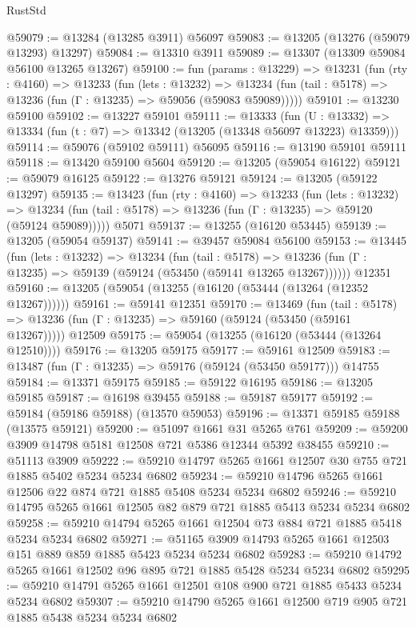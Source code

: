 \begin{lexlean}{RustStd}
\begin{coremodule}
@59079 := @13284 (@13285 @3911) @56097
@59083 := @13205 (@13276 (@59079 @13293) @13297)
@59084 := @13310 @3911
@59089 := @13307 (@13309 @59084 @56100 @13265 @13267)
@59100 := fun (params : @13229) =>
  @13231
    (fun (rty : @4160) =>
    @13233
      (fun (lets : @13232) =>
      @13234 (fun (tail : @5178) => @13236 (fun (Γ : @13235) => @59056 (@59083 @59089)))))
@59101 := @13230 @59100
@59102 := @13227 @59101
@59111 := @13333
    (fun (U : @13332) => @13334 (fun (t : @7) => @13342 (@13205 (@13348 @56097 @13223) @13359)))
@59114 := @59076 (@59102 @59111) @56095
@59116 := @13190 @59101 @59111
@59118 := @13420 @59100 @5604
@59120 := @13205 (@59054 @16122)
@59121 := @59079 @16125
@59122 := @13276 @59121
@59124 := @13205 (@59122 @13297)
@59135 := @13423
    (fun (rty : @4160) =>
    @13233
      (fun (lets : @13232) =>
      @13234 (fun (tail : @5178) => @13236 (fun (Γ : @13235) => @59120 (@59124 @59089)))))
    @5071
@59137 := @13255 (@16120 @53445)
@59139 := @13205 (@59054 @59137)
@59141 := @39457 @59084 @56100
@59153 := @13445
    (fun (lets : @13232) =>
    @13234
      (fun (tail : @5178) =>
      @13236 (fun (Γ : @13235) => @59139 (@59124 (@53450 (@59141 @13265 @13267))))))
    @12351
@59160 := @13205 (@59054 (@13255 (@16120 (@53444 (@13264 (@12352 @13267))))))
@59161 := @59141 @12351
@59170 := @13469
    (fun (tail : @5178) => @13236 (fun (Γ : @13235) => @59160 (@59124 (@53450 (@59161 @13267)))))
    @12509
@59175 := @59054 (@13255 (@16120 (@53444 (@13264 @12510))))
@59176 := @13205 @59175
@59177 := @59161 @12509
@59183 := @13487 (fun (Γ : @13235) => @59176 (@59124 (@53450 @59177))) @14755
@59184 := @13371 @59175
@59185 := @59122 @16195
@59186 := @13205 @59185
@59187 := @16198 @39455
@59188 := @59187 @59177
@59192 := @59184 (@59186 @59188) (@13570 @59053)
@59196 := @13371 @59185 @59188 (@13575 @59121)
@59200 := @51097 @1661 @31 @5265 @761
@59209 := @59200 @3909 @14798 @5181 @12508 @721 @5386 @12344 @5392 @38455
@59210 := @51113 @3909
@59222 := @59210 @14797 @5265 @1661 @12507 @30 @755 @721 @1885 @5402 @5234 @5234 @6802
@59234 := @59210 @14796 @5265 @1661 @12506 @22 @874 @721 @1885 @5408 @5234 @5234 @6802
@59246 := @59210 @14795 @5265 @1661 @12505 @82 @879 @721 @1885 @5413 @5234 @5234 @6802
@59258 := @59210 @14794 @5265 @1661 @12504 @73 @884 @721 @1885 @5418 @5234 @5234 @6802
@59271 := @51165 @3909 @14793 @5265 @1661 @12503 @151 @889 @859 @1885 @5423 @5234 @5234 @6802
@59283 := @59210 @14792 @5265 @1661 @12502 @96 @895 @721 @1885 @5428 @5234 @5234 @6802
@59295 := @59210 @14791 @5265 @1661 @12501 @108 @900 @721 @1885 @5433 @5234 @5234 @6802
@59307 := @59210 @14790 @5265 @1661 @12500 @719 @905 @721 @1885 @5438 @5234 @5234 @6802

\end{coremodule}
\end{lexlean}
